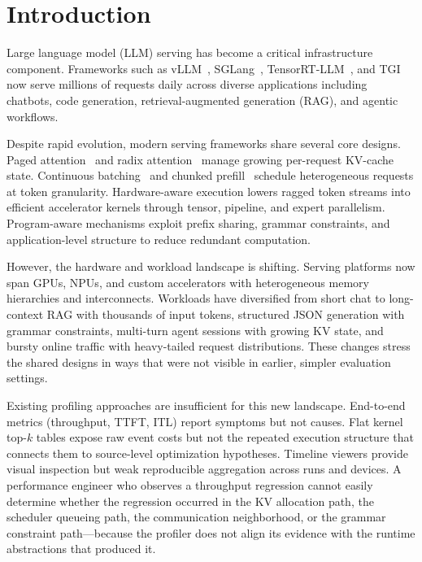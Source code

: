 \documentclass[conference]{IEEEtran}
\begin{document}
\section{Introduction}

Large language model (LLM) serving has become a critical infrastructure
component. Frameworks such as vLLM~\cite{vllm}, SGLang~\cite{sglang},
TensorRT-LLM~\cite{tensorrtllm}, and TGI~\cite{tgi} now serve millions of
requests daily across diverse applications including chatbots, code generation,
retrieval-augmented generation (RAG), and agentic workflows.

Despite rapid evolution, modern serving frameworks share several core designs.
Paged attention~\cite{vllm} and radix attention~\cite{sglang} manage growing
per-request KV-cache state. Continuous batching~\cite{orca} and chunked
prefill~\cite{sarathi} schedule heterogeneous requests at token granularity.
Hardware-aware execution lowers ragged token streams into efficient accelerator
kernels through tensor, pipeline, and expert parallelism. Program-aware
mechanisms exploit prefix sharing, grammar constraints, and application-level
structure to reduce redundant computation.

However, the hardware and workload landscape is shifting. Serving platforms now
span GPUs, NPUs, and custom accelerators with heterogeneous memory hierarchies
and interconnects. Workloads have diversified from short chat to long-context
RAG with thousands of input tokens, structured JSON generation with grammar
constraints, multi-turn agent sessions with growing KV state, and bursty online
traffic with heavy-tailed request distributions. These changes stress the shared
designs in ways that were not visible in earlier, simpler evaluation settings.

Existing profiling approaches are insufficient for this new landscape.
End-to-end metrics (throughput, TTFT, ITL) report symptoms but not causes.
Flat kernel top-$k$ tables expose raw event costs but not the repeated
execution structure that connects them to source-level optimization
hypotheses. Timeline viewers provide visual inspection but weak reproducible
aggregation across runs and devices. A performance engineer who observes a
throughput regression cannot easily determine whether the regression occurred
in the KV allocation path, the scheduler queueing path, the communication
neighborhood, or the grammar constraint path---because the profiler does not
align its evidence with the runtime abstractions that produced it.
\end{document}
